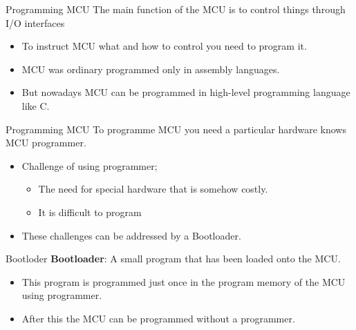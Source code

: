\documentclass{beamer}
\begin{document}
\begin{darkframes}
    
\begin{frame}[<+->]{Programming MCU}
	The main function of the MCU is to control things through I/O interfaces
	\begin{itemize}
		\item To instruct MCU what and how to control you need to program it.
		\item MCU was ordinary programmed only in assembly languages.
		\item But nowadays MCU can be programmed in high-level programming language like C.
	\end{itemize}
\end{frame}    
    
\begin{frame}[<+->]{Programming MCU}
	To programme MCU you need a particular hardware knows \alert{MCU programmer}.
	\begin{itemize}
		\item Challenge of using programmer;
		\begin{itemize}
			\item The need for special hardware that is somehow costly.
			\item It is difficult to program 
		\end{itemize}
		
		\item These challenges can be addressed by a \alert{Bootloader}.
	\end{itemize}
\end{frame}     

   \begin{frame}[<+->]{Bootloder}
   	\textbf{Bootloader}: A small  program that has been loaded onto the MCU.
   	\begin{itemize}
   		\item This program is programmed just once in the program memory of the MCU using programmer.	
   		\item After this the MCU can be programmed without a programmer.
   	\end{itemize}
   \end{frame}        


\end{darkframes}
\end{document}
